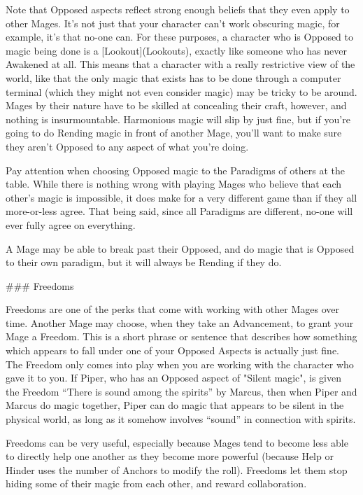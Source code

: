 \documentclass[
  oneside,
  statementpaper,
  9pt]{memoir}
\begin{document}
\begin{Player}
Note that Opposed aspects reflect strong enough beliefs that they even apply to other Mages. It’s not just that your character can’t work obscuring magic, for example, it’s that no-one can. For these purposes, a character who is Opposed to magic being done is a [Lookout](Lookouts), exactly like someone who has never Awakened at all. This means that a character with a really restrictive view of the world, like that the only magic that exists has to be done through a computer terminal (which they might not even consider magic) may be tricky to be around. Mages by their nature have to be skilled at concealing their craft, however, and nothing is insurmountable. Harmonious magic will slip by just fine, but if you’re going to do Rending magic in front of another Mage, you’ll want to make sure they aren’t Opposed to any aspect of what you’re doing. 

Pay attention when choosing Opposed magic to the Paradigms of others at the table. While there is nothing wrong with playing Mages who believe that each other’s magic is impossible, it does make for a very different game than if they all more-or-less agree. That being said, since all Paradigms are different, no-one will ever fully agree on everything.

A Mage may be able to break past their Opposed, and do magic that is Opposed to their own paradigm, but it will always be Rending if they do.

### Freedoms

Freedoms are one of the perks that come with working with other Mages over time. Another Mage may choose, when they take an Advancement, to grant your Mage a Freedom. This is a short phrase or sentence that describes how something which appears to fall under one of your Opposed Aspects is actually just fine. The Freedom only comes into play when you are working with the character who gave it to you. If Piper, who has an Opposed aspect of "Silent magic", is given the Freedom “There is sound among the spirits” by Marcus, then when Piper and Marcus do magic together, Piper can do magic that appears to be silent in the physical world, as long as it somehow involves “sound” in connection with spirits.

Freedoms can be very useful, especially because Mages tend to become less able to directly help one another as they become more powerful (because Help or Hinder uses the number of Anchors to modify the roll). Freedoms let them stop hiding some of their magic from each other, and reward collaboration.


\end{Player}
\end{document}
